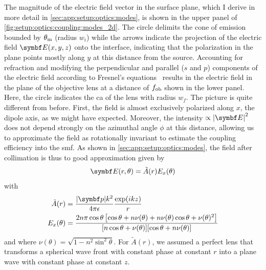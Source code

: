 The magnitude of the electric field vector in the surface plane, which I derive in more detail in \cref{sec:app:setup:optics:modes}, is shown in the upper panel of \cref{fig:setup:optics:coupling:modes_2d}.
The circle delimits the cone of emission bounded by $\theta_{\mathrm{m}}$ (radius $w_i$) while the arrows indicate the projection of the electric field $\bvec{E}(x, y, z)$ onto the interface, indicating that the polarization in the plane points mostly along $y$ at this distance from the source.
Accounting for refraction and modifying the perpendicular and parallel ($s$ and $p$) components of the electric field according to Fresnel's equations~\cite{Hecht2017} results in the electric field in the plane of the objective lens at a distance of $f_{\mathrm{ob}}$ shown in the lower panel.
Here, the circle indicates the \gls{ca} of the lens with radius $w_f$.
The picture is quite different from before.
First, the field is almost exclusively polarized along $x$, the dipole axis, as we might have expected.
Moreover, the intensity $\propto\abs{\bvec{E}}^2$ does not depend strongly on the azimuthal angle $\phi$ at this distance, allowing us to approximate the field as rotationally invariant to estimate the coupling efficiency into the \gls{smf}.
As shown in \cref{sec:app:setup:optics:modes}, the field after collimation is thus to good approximation given by
\begin{equation}\label{eq:setup:optics:coupling:efield:lens}
    \bvec{E}(r, \theta) = \tilde{A}(r)E_x(\theta)
\end{equation}
with
\begin{align}
    \tilde{A}(r) &= \frac{\abs{\bvec{p}}k^2}{4\pi\epsilon}\frac{\exp(\i k z)}{r} \\
    E_x(\theta) &= \frac{2n\pi\cos\theta\left[\cos\theta + n\nu(\theta) + n\nu(\theta)\cos\theta + \nu(\theta)^2\right]}{[n\cos\theta + \nu(\theta)][\cos\theta + n\nu(\theta)]} \label{eq:setup:optics:coupling:efield:lens:x}
\end{align}
and where $\nu(\theta) = \sqrt{1 - n^2\sin^2\theta}$.
For $\tilde{A}(r)$, we assumed a perfect lens that transforms a spherical wave front with constant phase at constant $r$ into a plane wave with constant phase at constant $z$.

